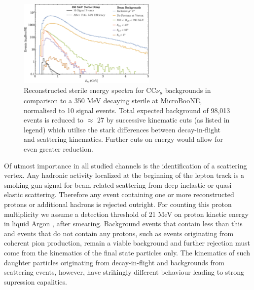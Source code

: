 \documentclass[11pt, a4paper]{article}
\def\muboone{MicroBooNE}
\begin{document}
\begin{figure}[h]
\center
\includegraphics[width=0.6\textwidth,clip,trim=0 0 0 0]{figures/mu_pi_cutflow.pdf}

\caption{\label{fig:mu_pi_cutflow} Reconstructed sterile energy spectra for
CC$\nu_\mu$ backgrounds in comparison to a 350 MeV decaying sterile at
\muboone, normalised to 10 signal events. Total expected background of 98,013
events is reduced to $\approx$ 27 by successive kinematic cuts (as listed in legend) which utilise
the stark differences between decay-in-flight and scattering kinematics. Further cuts on energy would allow for even greater reduction. }
\end{figure}

Of utmost importance in all studied channels is the identification of a
scattering vertex. Any hadronic activity localized at the beginning of the
lepton track is a smoking gun signal for beam related scattering from
deep-inelastic or quasi-elastic scattering. Therefore any event containing one
or more reconstructed protons or additional hadrons is rejected outright. For
counting this proton multiplicity we assume a detection threshold of 21 MeV on
proton kinetic energy in liquid Argon \cite{Acciarri:2014gev}, after smearing.
Background events that contain less than this and events that do not contain
any protons, such as events originating from coherent pion production, remain a
viable background and further rejection must come from the kinematics of the
final state particles only. The kinematics of such daughter particles
originating from decay-in-flight and backgrounds from scattering events,
however,  have strikingly different behaviour leading to strong supression
capalities.
\end{document}
